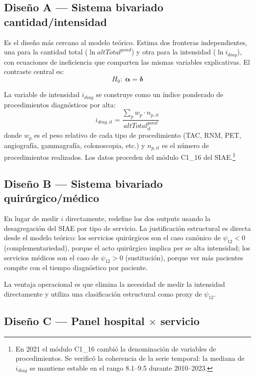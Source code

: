 \documentclass[12pt, a4paper, twoside, openright]{book}
\newcommand{\bsym}[1]{\boldsymbol{#1}}
\theoremstyle{plain}
\theoremstyle{definition}
\theoremstyle{remark}
\begin{document}
\subsection{Diseño A --- Sistema bivariado cantidad/intensidad}

Es el diseño más cercano al modelo teórico. Estima dos fronteras independientes, una para la cantidad total ($\ln altTotal^{pond}$) y otra para la intensidad ($\ln i_{diag}$), con ecuaciones de ineficiencia que comparten las mismas variables explicativas. El contraste central es:
\begin{equation}
  H_0:\; \bsym{\alpha} = \bsym{\delta}
  \label{eq:h0_pstar}
\end{equation}

La variable de intensidad $i_{diag}$ se construye como un índice ponderado de procedimientos diagnósticos por alta:
\begin{equation}
  i_{diag,it} = \frac{\sum_p w_p \cdot n_{p,it}}{altTotal^{pond}_{it}}
  \label{eq:i_diag}
\end{equation}
donde $w_p$ es el peso relativo de cada tipo de procedimiento (TAC, RNM, PET, angiografía, gammagrafía, colonoscopia, etc.) y $n_{p,it}$ es el número de procedimientos realizados. Los datos proceden del módulo C1\_16 del SIAE.\footnote{En 2021 el módulo C1\_16 cambió la denominación de variables de procedimientos. Se verificó la coherencia de la serie temporal: la mediana de $i_{diag}$ se mantiene estable en el rango 8.1--9.5 durante 2010--2023.}

\subsection{Diseño B --- Sistema bivariado quirúrgico/médico}

En lugar de medir $i$ directamente, redefine los dos outputs usando la desagregación del SIAE por tipo de servicio. La justificación estructural es directa desde el modelo teórico: los servicios quirúrgicos son el caso canónico de $\psi_{12} < 0$ (complementariedad), porque el acto quirúrgico implica per se alta intensidad; los servicios médicos son el caso de $\psi_{12} > 0$ (sustitución), porque ver más pacientes compite con el tiempo diagnóstico por paciente.

La ventaja operacional es que elimina la necesidad de medir la intensidad directamente y utiliza una clasificación estructural como proxy de $\psi_{12}$.

\subsection{Diseño C --- Panel hospital \texorpdfstring{$\times$}{x} servicio}
\end{document}
